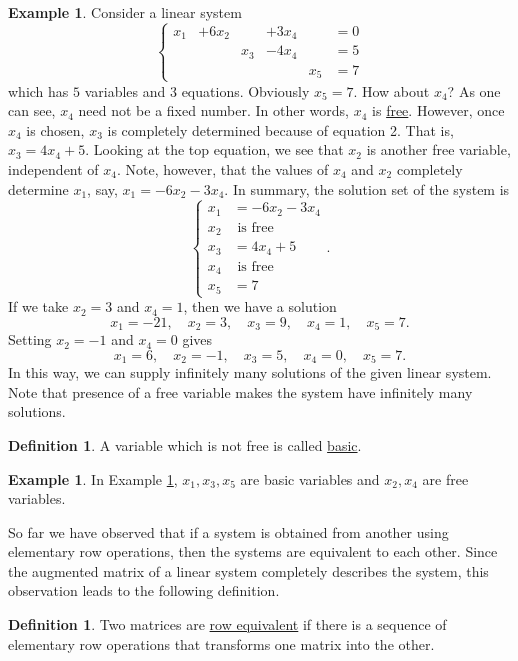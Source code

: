 \documentclass[12pt,letterpaper]{book}
\numberwithin{equation}{section}
\theoremstyle{definition}
\newtheorem{defi}[thm]{\textbf{Definition}}
\newtheorem{example}[thm]{\textbf{Example}}
\begin{document}
\begin{example}\label{first infinite} Consider a linear system
$$\left\{\begin{array}{rrrrrr}
x_1&+6x_2&&+3x_4&&=0 \\
&&x_3&-4x_4&&=5 \\&&&&x_5&=7
 \end{array}\right.$$
which has $5$ variables and $3$ equations. Obviously $x_5=7$. How about $x_4$? As
one can see, $x_4$ need not be a fixed number. In other words, $x_4$
is \underline{free}. However, once $x_4$ is chosen, $x_3$ is
completely determined because of equation 2. That is, $x_3=4x_4+5$. Looking at the top equation, we see that $x_2$ is another free variable, independent of $x_4$. Note, however, that the values of $x_4$ and $x_2$ completely determine $x_1$, say,
$x_1=-6x_2-3x_4$. In summary, the solution set of the system is
$$\left\{\begin{array}{rl}x_1&=-6x_2-3x_4 \\ x_2&\text{ is free} \\ x_3&=4x_4+5 \\ x_4&\text{ is free} \\ x_5&=7\end{array}\right..$$
If we take $x_2=3$ and $x_4=1$, then we have a solution
$$x_1=-21,\quad x_2=3,\quad
x_3=9,\quad x_4=1,\quad
x_5=7.$$ Setting $x_2=-1$ and $x_4=0$ gives
$$x_1=6,\quad x_2=-1,\quad
x_3=5,\quad x_4=0,\quad
x_5=7.$$ In this way, we can supply infinitely many
solutions of the given linear system. Note that presence of a free variable makes the system have infinitely many solutions.
\end{example}

\begin{defi} A variable which is not free is called
\underline{basic}.
\end{defi}

\begin{example} In Example \ref{first infinite}, $x_1,x_3,x_5$ are basic variables and $x_2,x_4$ are free variables.
\end{example}

So far we have observed that if a system is obtained from another using elementary row operations, then the systems are equivalent to each other. Since the augmented matrix of a linear system completely describes the system, this observation leads to the following definition.

\begin{defi} Two matrices are \underline{row equivalent} if
there is a sequence of elementary row operations that transforms
one matrix into the other.
\end{defi}
\end{document}
